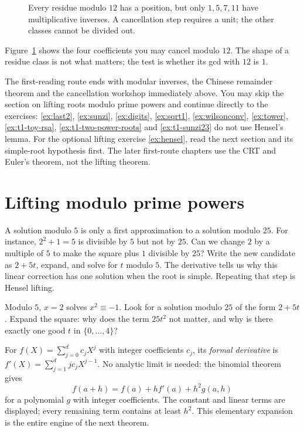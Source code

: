 \begin{figure}[ht]
\centering
{}
\caption{Every residue modulo $12$ has a position, but only
$1,5,7,11$ have multiplicative inverses. A cancellation step
requires a unit; the other classes cannot be divided out.}
\label{fig:congruence-unit-classes}
\end{figure}

Figure~\ref{fig:congruence-unit-classes} shows the four coefficients you may cancel modulo $12$. The shape of a residue class is not what matters; the test is whether its gcd with $12$ is $1$.

\begin{reminder}
The first-reading route ends with modular inverses, the Chinese remainder
theorem and the cancellation workshop immediately above. You may skip
the section on lifting roots modulo prime powers and continue directly
to the exercises: \ref{ex:last2}, \ref{ex:sunzi}, \ref{ex:digits},
\ref{ex:sqrt1}, \ref{ex:wilsonconv}, \ref{ex:tower},
\ref{ex:t1-toy-rsa}, \ref{ex:t1-two-power-roots} and
\ref{ex:t1-sunzi23} do not use Hensel's lemma.
For the optional lifting exercise \ref{ex:hensel}, read the next section
and its simple-root hypothesis first. The later first-route chapters
use the CRT and Euler's theorem, not the lifting theorem.
\end{reminder}

\section{Lifting modulo prime powers}

A solution modulo $5$ is only a first approximation to a solution modulo $25$. For instance, $2^2+1=5$ is divisible by $5$ but not by $25$. Can we change $2$ by a multiple of $5$ to make the square plus $1$ divisible by $25$? Write the new candidate as $2+5t$, expand, and solve for $t$ modulo $5$. The derivative tells us why this linear correction has one solution when the root is simple. Repeating that step is Hensel lifting.

\begin{think}
Modulo $5$, $x=2$ solves $x^2\equiv-1$. Look for a solution modulo $25$ of the form $2+5t$. Expand the square: why does the term $25t^2$ not matter, and why is there exactly one good $t$ in $\{0,\dots,4\}$?
\end{think}

For $f(X)=\sum_{j=0}^d c_jX^j$ with integer coefficients $c_j$, its \emph{formal derivative} is $f'(X)=\sum_{j=1}^d jc_jX^{j-1}$. No analytic limit is needed: the binomial theorem gives
\[
f(a+h)=f(a)+hf'(a)+h^2g(a,h)
\]
for a polynomial $g$ with integer coefficients. The constant and linear terms are displayed; every remaining term contains at least $h^2$. This elementary expansion is the entire engine of the next theorem.

